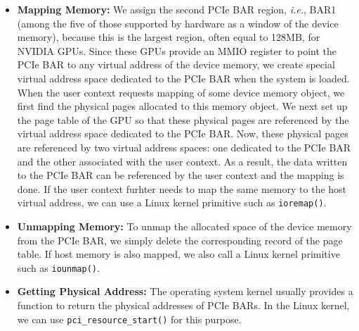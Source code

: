 \begin{itemize} \itemsep1pt
 \item \textbf{Mapping Memory:}
       We assign the second PCIe BAR region, \textit{i.e.}, BAR1 (among
       the five of those supported by hardware as a window of the device
       memory), because this is the largest region, often equal to 128MB,
       for NVIDIA GPUs.
       Since these GPUs provide an MMIO register to point the PCIe BAR
       to any virtual address of the device 
       memory, we create special virtual address space dedicated to the
       PCIe BAR when the system is loaded.
       When the user context requests mapping of some device memory
       object, we first find the physical pages allocated to this
       memory object.
       We next set up the page table of the GPU so that these
       physical pages are referenced by the virtual address space
       dedicated to the PCIe BAR.
       Now, these physical pages are referenced by two virtual address
       spaces: one dedicated to the PCIe BAR and the other associated
       with the user context.
       As a result, the data written to the PCIe BAR can be referenced
       by the user context and the mapping is done.
       If the user context furhter needs to map the same memory to the
       host virtual address, we can use a Linux kernel primitive such as
       {\tt ioremap()}.
 \item \textbf{Unmapping Memory:}
       To unmap the allocated space of the device memory from the PCIe
       BAR, we simply delete the corresponding record of the page table.
       If host memory is also mapped, we also call a Linux kernel
       primitive such as {\tt iounmap()}.
 \item \textbf{Getting Physical Address:}
       The operating system kernel usually provides a function to return
       the physical addresses of PCIe BARs.
       In the Linux kernel, we can use {\tt pci\_resource\_start()} for
       this purpose.
\end{itemize}
